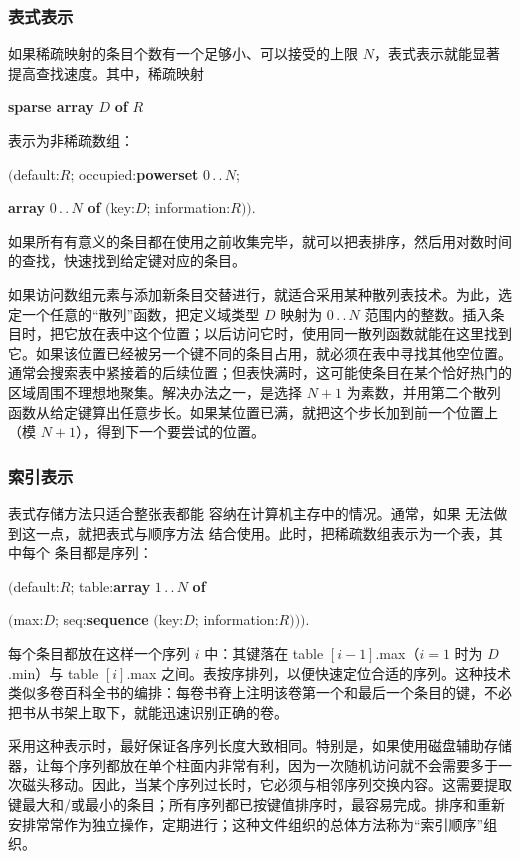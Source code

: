 \documentclass[twoside,11pt,fontset=none]{ctexbook}
\begin{document}
\subsubsection{表式表示}

如果稀疏映射的条目个数有一个足够小、可以接受的上限 $N$，表式表示就能显著提高查找速度。其中，稀疏映射

\quad \textbf{sparse array} $D$ \textbf{of} $R$

\noindent
表示为非稀疏数组：

\quad $($default:$R$; occupied:\textbf{powerset} $0\,.\,.\,N$;

\tabto*{8em}\textbf{array} $0\,.\,.\,N$ \textbf{of} $($key:$D$; information:$R))$.

\noindent
如果所有有意义的条目都在使用之前收集完毕，就可以把表排序，然后用对数时间的查找，快速找到给定键对应的条目。

如果访问数组元素与添加新条目交替进行，就适合采用某种散列表技术。为此，选定一个任意的“散列”函数，把定义域类型 $D$ 映射为 $0\,.\,.\,N$ 范围内的整数。插入条目时，把它放在表中这个位置；以后访问它时，使用同一散列函数就能在这里找到它。如果该位置已经被另一个键不同的条目占用，就必须在表中寻找其他空位置。通常会搜索表中紧接着的后续位置；但表快满时，这可能使条目在某个恰好热门的区域周围不理想地聚集。解决办法之一，是选择 $N + 1$ 为素数，并用第二个散列函数从给定键算出任意步长。如果某位置已满，就把这个步长加到前一个位置上（模 $N + 1$），得到下一个要尝试的位置。

\subsubsection{索引表示}

表式存储方法只适合整张表都能
容纳在计算机主存中的情况。通常，如果
无法做到这一点，就把表式与顺序方法
结合使用。此时，把稀疏数组表示为一个表，其中每个
条目都是序列：

\quad $($default:$R$; table:\textbf{array} $1\,.\,.\,N$ \textbf{of}

\tabto*{10em}$($max:$D$; seq:\textbf{sequence} $($key:$D$; information:$R)))$.

\noindent
每个条目都放在这样一个序列 $i$ 中：其键落在 table $[i - 1]$.max（$i = 1$ 时为 $D$.min）与 table $[i]$.max 之间。表按序排列，以便快速定位合适的序列。这种技术类似多卷百科全书的编排：每卷书脊上注明该卷第一个和最后一个条目的键，不必把书从书架上取下，就能迅速识别正确的卷。

采用这种表示时，最好保证各序列长度大致相同。特别是，如果使用磁盘辅助存储器，让每个序列都放在单个柱面内非常有利，因为一次随机访问就不会需要多于一次磁头移动。因此，当某个序列过长时，它必须与相邻序列交换内容。这需要提取键最大和/或最小的条目；所有序列都已按键值排序时，最容易完成。排序和重新安排常常作为独立操作，定期进行；这种文件组织的总体方法称为“索引顺序”组织。
\end{document}
